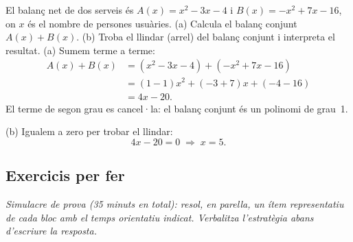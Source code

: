 \begin{exresolt}
El balanç net de dos serveis és $A(x)=x^2-3x-4$ i $B(x)=-x^2+7x-16$, on
$x$ és el nombre de persones usuàries. (a) Calcula el balanç conjunt
$A(x)+B(x)$. (b) Troba el llindar (arrel) del balanç conjunt i
interpreta el resultat.
\solucio
(a) Sumem terme a terme:
\begin{align*}
A(x)+B(x) &= (x^2-3x-4)+(-x^2+7x-16) \\
          &= (1-1)x^2+(-3+7)x+(-4-16) \\
          &= 4x-20.
\end{align*}
El terme de segon grau es cancel·la: el balanç conjunt és un polinomi de
grau~1.

\noindent(b) Igualem a zero per trobar el llindar:
\[
4x-20=0 \;\Longrightarrow\; x=5.
\]
\end{exresolt}

\subsection{Exercicis per fer}

\noindent\textit{Simulacre de prova (35 minuts en total): resol, en
parella, un ítem representatiu de cada bloc amb el temps orientatiu
indicat. Verbalitza l'estratègia abans d'escriure la resposta.}

